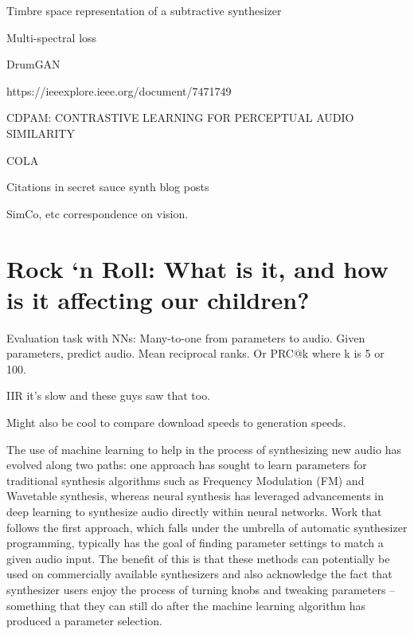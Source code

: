 Timbre space representation of a subtractive synthesizer \cite{vahidi2020timbre}

Multi-spectral loss \cite{wang2019neural}

DrumGAN \cite{nistal2020drumgan}

https://ieeexplore.ieee.org/document/7471749

CDPAM: CONTRASTIVE LEARNING FOR PERCEPTUAL AUDIO SIMILARITY

COLA

Citations in secret sauce synth blog posts

SimCo, etc correspondence on vision.

\section{Rock `n Roll: What is it, and how is it affecting our children?}

Evaluation task with NNs: Many-to-one from parameters to audio. Given parameters, predict audio. Mean reciprocal ranks. Or PRC@k where k is 5 or 100.

IIR it's slow and these guys saw that too.

Might also be cool to compare download speeds to generation speeds.


The use of machine learning to help in the process of synthesizing new audio has evolved along two paths: one approach has sought to learn parameters for traditional synthesis algorithms such as Frequency Modulation (FM) and Wavetable synthesis, whereas neural synthesis has leveraged advancements in deep learning to synthesize audio directly within neural networks. Work that follows the first approach, which falls under the umbrella of automatic synthesizer programming, typically has the goal of finding parameter settings to match a given audio input. The benefit of this is that these methods can potentially be used on commercially available synthesizers and also acknowledge the fact that synthesizer users enjoy the process of turning knobs and tweaking parameters – something that they can still do after the machine learning algorithm has produced a parameter selection. 
\fi

